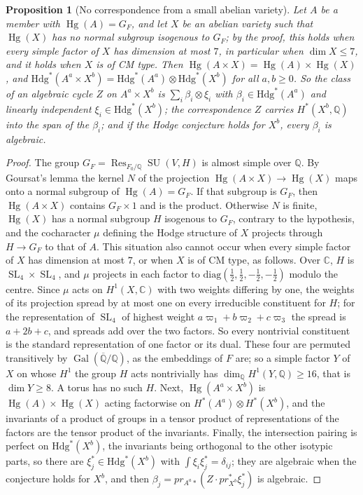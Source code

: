 \documentclass[11pt,reqno]{amsart}
\theoremstyle{plain}
\newtheorem{proposition}[theorem]{Proposition}
\theoremstyle{definition}
\theoremstyle{remark}
\newcommand{\QQ}{\mathbb{Q}}
\newcommand{\CC}{\mathbb{C}}
\newcommand{\Hdg}{\mathrm{Hdg}}
\DeclareMathOperator{\Res}{Res}
\DeclareMathOperator{\Hg}{Hg}
\DeclareMathOperator{\Gal}{Gal}
\DeclareMathOperator{\SL}{SL}
\DeclareMathOperator{\SU}{SU}
\newcommand{\bbar}[1]{\overline{#1}}
\begin{document}
\begin{proposition}[No correspondence from a small abelian variety]
\label{prop:quarticnogo}
Let $A$ be a member with $\Hg(A)=G_{F}$, and let $X$ be an abelian variety
such that $\Hg(X)$ has no normal subgroup isogenous to $G_{F}$; by the proof,
this holds when every simple factor of $X$ has dimension at most $7$, in
particular when $\dim X\le7$, and it holds when $X$ is of CM type. Then
$\Hg(A\times X)=\Hg(A)\times\Hg(X)$, and
$\Hdg^{*}(A^{a}\times X^{b})=\Hdg^{*}(A^{a})\otimes\Hdg^{*}(X^{b})$ for all
$a,b\ge0$. So the class of an algebraic cycle $Z$ on $A^{a}\times X^{b}$ is
$\sum_{i}\beta_{i}\otimes\xi_{i}$ with $\beta_{i}\in\Hdg^{*}(A^{a})$ and
linearly independent $\xi_{i}\in\Hdg^{*}(X^{b})$; the correspondence $Z$
carries $H^{*}(X^{b},\QQ)$ into the span of the $\beta_{i}$; and if the Hodge
conjecture holds for $X^{b}$, every $\beta_{i}$ is algebraic.
\end{proposition}

\begin{proof}
The group $G_{F}=\Res_{F_{0}/\QQ}\SU(V,H)$ is almost simple over $\QQ$. By
Goursat's lemma the kernel $N$ of the projection $\Hg(A\times X)\to\Hg(X)$
maps onto a normal subgroup of $\Hg(A)=G_{F}$. If that subgroup is $G_{F}$,
then $\Hg(A\times X)$ contains $G_{F}\times1$ and is the product. Otherwise
$N$ is finite, $\Hg(X)$ has a normal subgroup $H$ isogenous to $G_{F}$,
contrary to the hypothesis, and the cocharacter $\mu$ defining the Hodge
structure of $X$ projects through $H\to G_{F}$ to that of $A$. This situation
also cannot occur when every simple factor of $X$ has dimension at most $7$,
or when $X$ is of CM type, as follows. Over $\CC$, $H$ is $\SL_{4}\times\SL_{4}$,
and $\mu$ projects in each factor to
$\mathrm{diag}(\frac12,\frac12,-\frac12,-\frac12)$ modulo the centre. Since
$\mu$ acts on $H^{1}(X,\CC)$ with two weights differing by one, the weights of
its projection spread by at most one on every irreducible constituent for
$H$; for the representation of $\SL_{4}$ of highest weight
$a\varpi_{1}+b\varpi_{2}+c\varpi_{3}$ the spread is $a+2b+c$, and spreads add
over the two factors. So every nontrivial constituent is the standard
representation of one factor or its dual. These four are permuted
transitively by $\Gal(\bbar\QQ/\QQ)$, as the embeddings of $F$ are; so a simple
factor $Y$ of $X$ on whose $H^{1}$ the group $H$ acts nontrivially has
$\dim_{\QQ}H^{1}(Y,\QQ)\ge16$, that is $\dim Y\ge8$. A torus has no such $H$.
Next, $\Hg(A^{a}\times X^{b})$ is $\Hg(A)\times\Hg(X)$ acting factorwise on
$H^{*}(A^{a})\otimes H^{*}(X^{b})$, and the invariants of a product of groups
in a tensor product of representations of the factors are the tensor product
of the invariants. Finally, the intersection pairing is perfect on
$\Hdg^{*}(X^{b})$, the invariants being orthogonal to the other isotypic
parts, so there are $\xi_{j}^{*}\in\Hdg^{*}(X^{b})$ with
$\int\xi_{i}\xi_{j}^{*}=\delta_{ij}$; they are algebraic when the conjecture
holds for $X^{b}$, and then $\beta_{j}=pr_{A^{a}*}(Z\cdot pr_{X^{b}}^{*}\xi_{j}^{*})$
is algebraic.
\end{proof}
\end{document}
